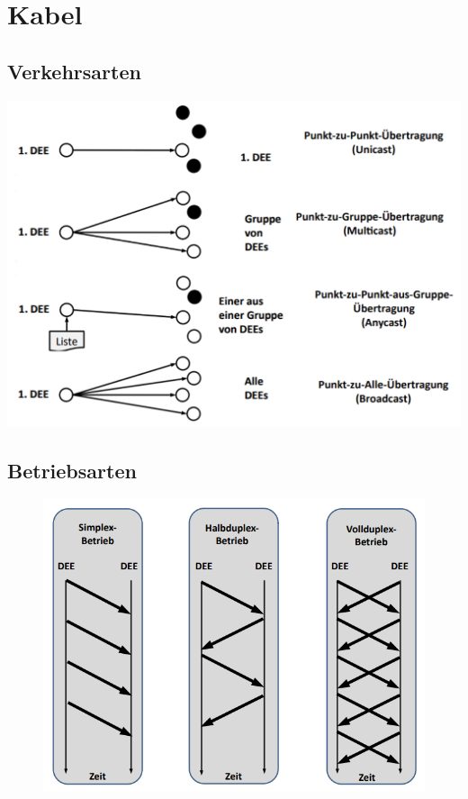 \documentclass[12pt,a4paper]{article}
\begin{document}
	\section{Kabel}
		\subsection{Verkehrsarten}
			\includegraphics[width=\textwidth]{Bilder/Verkehrsarten.PNG}

		\subsection{Betriebsarten}
			\begin{center}
				\begin{figure}[!h]
					\includegraphics[scale=1]{Bilder/Duplexarten.PNG}
				\end{figure}
			\end{center}
\end{document}
